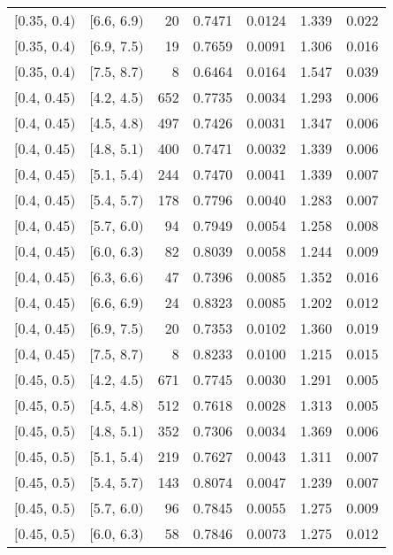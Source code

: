 \begin{longtable}{| l | l | r | r | r | r | r |}
        $[$0.35, 0.4$)$ & $[$6.6, 6.9$)$ & 20  & 0.7471 & 0.0124 & 1.339 & 0.022 \\
        $[$0.35, 0.4$)$ & $[$6.9, 7.5$)$ & 19  & 0.7659 & 0.0091 & 1.306 & 0.016 \\
        $[$0.35, 0.4$)$ & $[$7.5, 8.7$)$ & 8   & 0.6464 & 0.0164 & 1.547 & 0.039 \\
        $[$0.4, 0.45$)$ & $[$4.2, 4.5$)$ & 652 & 0.7735 & 0.0034 & 1.293 & 0.006 \\
        $[$0.4, 0.45$)$ & $[$4.5, 4.8$)$ & 497 & 0.7426 & 0.0031 & 1.347 & 0.006 \\
        $[$0.4, 0.45$)$ & $[$4.8, 5.1$)$ & 400 & 0.7471 & 0.0032 & 1.339 & 0.006 \\
        $[$0.4, 0.45$)$ & $[$5.1, 5.4$)$ & 244 & 0.7470 & 0.0041 & 1.339 & 0.007 \\
        $[$0.4, 0.45$)$ & $[$5.4, 5.7$)$ & 178 & 0.7796 & 0.0040 & 1.283 & 0.007 \\
        $[$0.4, 0.45$)$ & $[$5.7, 6.0$)$ & 94  & 0.7949 & 0.0054 & 1.258 & 0.008 \\
        $[$0.4, 0.45$)$ & $[$6.0, 6.3$)$ & 82  & 0.8039 & 0.0058 & 1.244 & 0.009 \\
        $[$0.4, 0.45$)$ & $[$6.3, 6.6$)$ & 47  & 0.7396 & 0.0085 & 1.352 & 0.016 \\
        $[$0.4, 0.45$)$ & $[$6.6, 6.9$)$ & 24  & 0.8323 & 0.0085 & 1.202 & 0.012 \\
        $[$0.4, 0.45$)$ & $[$6.9, 7.5$)$ & 20  & 0.7353 & 0.0102 & 1.360 & 0.019 \\
        $[$0.4, 0.45$)$ & $[$7.5, 8.7$)$ & 8   & 0.8233 & 0.0100 & 1.215 & 0.015 \\
        $[$0.45, 0.5$)$ & $[$4.2, 4.5$)$ & 671 & 0.7745 & 0.0030 & 1.291 & 0.005 \\
        $[$0.45, 0.5$)$ & $[$4.5, 4.8$)$ & 512 & 0.7618 & 0.0028 & 1.313 & 0.005 \\
        $[$0.45, 0.5$)$ & $[$4.8, 5.1$)$ & 352 & 0.7306 & 0.0034 & 1.369 & 0.006 \\
        $[$0.45, 0.5$)$ & $[$5.1, 5.4$)$ & 219 & 0.7627 & 0.0043 & 1.311 & 0.007 \\
        $[$0.45, 0.5$)$ & $[$5.4, 5.7$)$ & 143 & 0.8074 & 0.0047 & 1.239 & 0.007 \\
        $[$0.45, 0.5$)$ & $[$5.7, 6.0$)$ & 96  & 0.7845 & 0.0055 & 1.275 & 0.009 \\
        $[$0.45, 0.5$)$ & $[$6.0, 6.3$)$ & 58  & 0.7846 & 0.0073 & 1.275 & 0.012 \\

\end{longtable}
